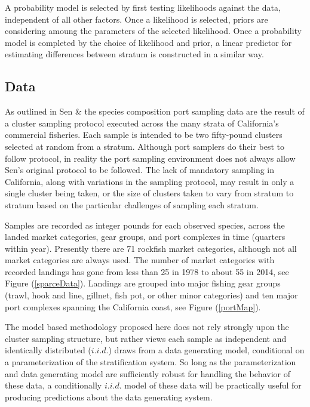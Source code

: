 \documentclass[12pt]{article}
\begin{document}
%
A probability model is selected by first testing likelihoods against the data, 
independent of all other factors. Once a likelihood is selected, priors are 
considering amoung the parameters of the selected likelihood. Once a 
probability model is completed by the choice of likelihood and prior, a linear 
predictor for estimating differences between stratum is constructed in a 
similar way.



%
%
\subsection{Data}\label{data}
%
%

%
As outlined in Sen \citeyear{sen_sampling_1984} \& 
\citeyear{sen_methodological_1986} the species composition port sampling data %
are the result of a cluster sampling protocol executed across the many strata 
of California's commercial fisheries.  Each sample is intended to be two 
fifty-pound clusters selected at random from a stratum. Although port samplers 
do their best to follow protocol, in reality the port sampling environment does 
not always allow Sen's original protocol to be followed. The lack of mandatory 
sampling in California, along with variations in the sampling protocol, may 
result in only a single cluster being taken, or the size of clusters taken to 
vary from stratum to stratum based on the particular challenges of sampling 
each stratum.

%
Samples are recorded as integer pounds for each observed species, across the 
landed market categories, gear groups, and port complexes in time (quarters 
within year). Presently there are 71 rockfish market categories, although not 
all market categories are always used. The number of market categories with 
recorded landings has gone from less than 25 in 1978 to about 55 in 2014, see 
Figure (\ref{sparceData}).  Landings are grouped into major fishing gear 
groups (trawl, hook and line, gillnet, fish pot, or other minor categories) 
and ten major port complexes spanning the California coast, see 
Figure (\ref{portMap}).

%
The model based methodology proposed here does not rely strongly upon
the cluster sampling structure, but rather views each sample as
independent and identically distributed (\(i.i.d.\)) draws from a data
generating model, conditional on a parameterization of the
stratification system. So long as the parameterization and data
generating model are sufficiently robust for handling the behavior of
these data, a conditionally \(i.i.d.\) model of these data will be
practically useful for producing predictions about the data generating
system.
\end{document}
